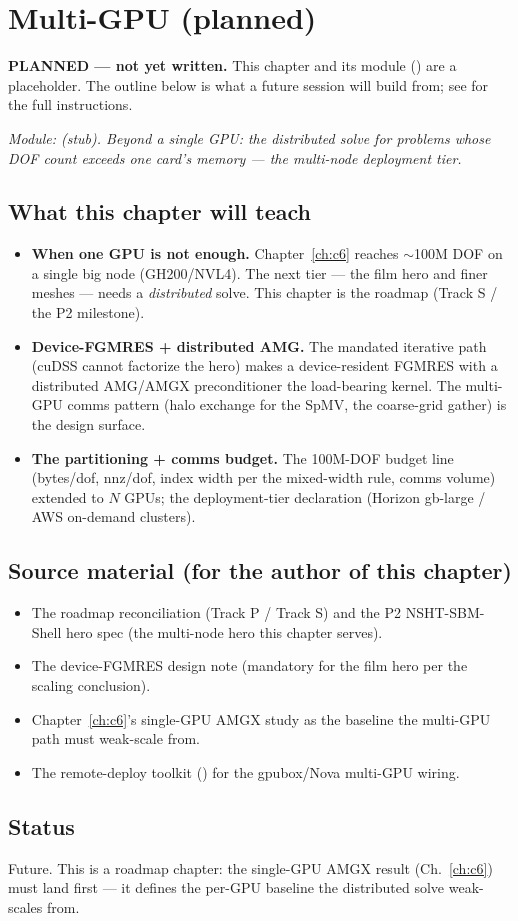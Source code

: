 \chapter{Multi-GPU (planned)}
\label{ch:c7}

\begin{keybox}\textbf{PLANNED --- not yet written.} This chapter and its
module () are a placeholder. The outline below is what
a future session will build from; see  for the full
instructions.\end{keybox}

\emph{Module:  (stub). Beyond a single GPU: the
distributed solve for problems whose DOF count exceeds one card's memory ---
the multi-node deployment tier.}

\section*{What this chapter will teach}
\begin{itemize}
\item \textbf{When one GPU is not enough.} Chapter~\ref{ch:c6} reaches
  ${\sim}$100M DOF on a single big node (GH200/NVL4). The next tier ---
  the film hero and finer meshes --- needs a \emph{distributed} solve. This
  chapter is the roadmap (Track S / the P2 milestone).
\item \textbf{Device-FGMRES + distributed AMG.} The mandated iterative path
  (cuDSS cannot factorize the hero) makes a device-resident FGMRES with a
  distributed AMG/AMGX preconditioner the load-bearing kernel. The
  multi-GPU comms pattern (halo exchange for the SpMV, the coarse-grid
  gather) is the design surface.
\item \textbf{The partitioning + comms budget.} The 100M-DOF budget line
  (bytes/dof, nnz/dof, index width per the mixed-width rule, comms volume)
  extended to $N$ GPUs; the deployment-tier declaration (Horizon
  gb-large / AWS on-demand clusters).
\end{itemize}

\section*{Source material (for the author of this chapter)}
\begin{itemize}
\item The roadmap reconciliation (Track P / Track S) and the P2
  NSHT-SBM-Shell hero spec (the multi-node hero this chapter serves).
\item The device-FGMRES design note (mandatory for the film hero per the
  scaling conclusion).
\item Chapter~\ref{ch:c6}'s single-GPU AMGX study as the baseline the
  multi-GPU path must weak-scale from.
\item The remote-deploy toolkit () for the
  gpubox/Nova multi-GPU wiring.
\end{itemize}

\section*{Status}
Future. This is a roadmap chapter: the single-GPU AMGX result
(Ch.~\ref{ch:c6}) must land first --- it defines the per-GPU baseline the
distributed solve weak-scales from.
